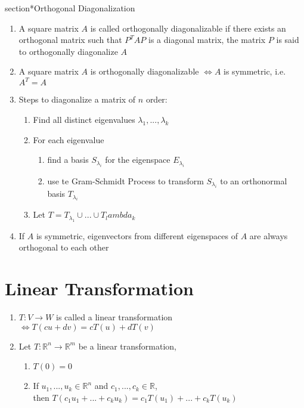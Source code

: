 \documentclass{article}
\begin{document}
section*{Orthogonal Diagonalization}
\begin{enumerate}
    \item A square matrix $A$ is called orthogonally diagonalizable if there exists an orthogonal matrix such that $P^TAP$ is a diagonal matrix, the matrix $P$ is said to orthogonally diagonalize $A$
    \item A square matrix $A$ is orthogonally diagonalizable $\Leftrightarrow A$ is symmetric, i.e. $A^T = A$
    \item Steps to diagonalize a matrix of $n$ order: \begin{enumerate}
        \item Find all distinct eigenvalues $\lambda_1, ..., \lambda_k$
        \item For each eigenvalue \begin{enumerate}
            \item find a basis $S_\lambda_i$ for the eigenspace $E_\lambda_i$
            \item use te Gram-Schmidt Process to transform $S_\lambda_i$ to an orthonormal basis $T_\lambda_i$
        \end{enumerate}
        \item Let $T = T_\lambda_1 \cup ... \cup T_lambda_k$ 
    \end{enumerate}
    \item If $A$ is symmetric, eigenvectors from different eigenspaces of $A$ are always orthogonal to each other
\end{enumerate}

\section*{Linear Transformation}
\begin{enumerate}
    \item $T: V \rightarrow W$ is called a linear transformation $\Leftrightarrow T(cu + dv) = cT(u) + dT(v)$
    \item Let $T: \mathbb{R}^n \rightarrow \mathbb{R}^m$ be a linear transformation, \\
    \begin{enumerate}
        \item $T(0) = 0$
        \item If $u_1, ..., u_k \in \mathbb{R}^n$ and $c_1, ..., c_k \in \mathbb{R}$, \\
        then $T(c_1u_1 + ... + c_ku_k) = c_1T(u_1) + ... + c_kT(u_k)$
    \end{enumerate}
\end{enumerate}
\end{document}
